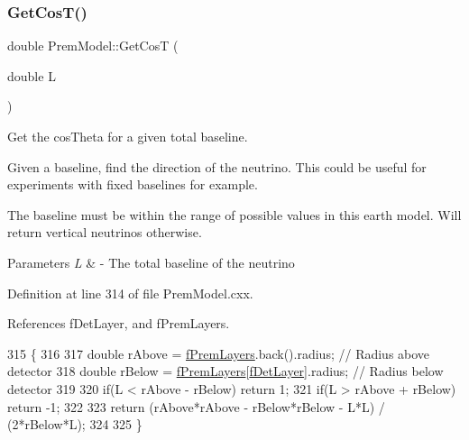 \subsubsection{\texorpdfstring{Get\+Cos\+T()}{GetCosT()}}
{\footnotesize\ttfamily double Prem\+Model\+::\+Get\+CosT (\begin{DoxyParamCaption}\item[{double}]{L }\end{DoxyParamCaption})\hspace{0.3cm}{\ttfamily [virtual]}}

Get the cos\+Theta for a given total baseline.

Given a baseline, find the direction of the neutrino. This could be useful for experiments with fixed baselines for example.

The baseline must be within the range of possible values in this earth model. Will return vertical neutrinos otherwise.


\begin{DoxyParams}{Parameters}
{\em L} & -\/ The total baseline of the neutrino \\
\hline
\end{DoxyParams}


Definition at line 314 of file Prem\+Model.\+cxx.



References f\+Det\+Layer, and f\+Prem\+Layers.


\begin{DoxyCode}
315 \{
316 
317   \textcolor{keywordtype}{double} rAbove = \hyperlink{classOscProb_1_1PremModel_a19a9a3b23ec154ad7a29f92b74aa5bc6}{fPremLayers}.back().radius;     \textcolor{comment}{// Radius above detector}
318   \textcolor{keywordtype}{double} rBelow = \hyperlink{classOscProb_1_1PremModel_a19a9a3b23ec154ad7a29f92b74aa5bc6}{fPremLayers}[\hyperlink{classOscProb_1_1PremModel_a4fb68506493666349f418b893a996185}{fDetLayer}].radius; \textcolor{comment}{// Radius below detector}
319 
320   \textcolor{keywordflow}{if}(L < rAbove - rBelow) \textcolor{keywordflow}{return}  1;
321   \textcolor{keywordflow}{if}(L > rAbove + rBelow) \textcolor{keywordflow}{return} -1;
322 
323   \textcolor{keywordflow}{return} (rAbove*rAbove - rBelow*rBelow - L*L) / (2*rBelow*L);
324 
325 \}
\end{DoxyCode}
\mbox{\label{classOscProb_1_1PremModel_af1b8392d1b00560c6322bf8707c304f6}} 
